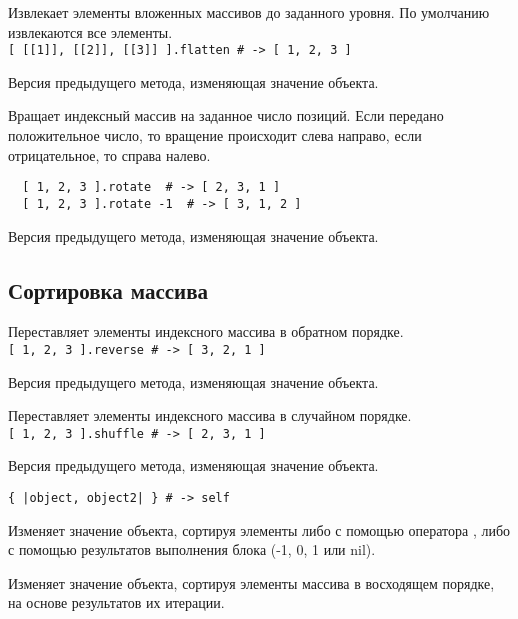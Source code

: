 \begin{methodlist}
  Извлекает элементы вложенных массивов до заданного уровня. По умолчанию извлекаются все элементы. 
  \\\verb![ [[1]], [[2]], [[3]] ].flatten # -> [ 1, 2, 3 ]!
 
  Версия предыдущего метода, изменяющая значение объекта. 

  Вращает индексный массив на заданное число позиций. Если передано положительное число, то вращение происходит слева направо, если отрицательное, то справа налево.
  \begin{verbatim}
  [ 1, 2, 3 ].rotate  # -> [ 2, 3, 1 ]
  [ 1, 2, 3 ].rotate -1  # -> [ 3, 1, 2 ]
  \end{verbatim}

  Версия предыдущего метода, изменяющая значение объекта. 
\end{methodlist}

\subsection*{Сортировка массива}

\begin{methodlist}
  Переставляет элементы индексного массива в обратном порядке. 
  \\\verb![ 1, 2, 3 ].reverse # -> [ 3, 2, 1 ]!

  Версия предыдущего метода, изменяющая значение объекта. 

  Переставляет элементы индексного массива в случайном порядке. 
  \\\verb![ 1, 2, 3 ].shuffle # -> [ 2, 3, 1 ]!

  Версия предыдущего метода, изменяющая значение объекта. 

  \verb!{ |object, object2| } # -> self!

  Изменяет значение объекта, сортируя элементы либо с помощью оператора \method{<=>}, либо с помощью результатов выполнения блока (-1, 0, 1 или nil).

  Изменяет значение объекта, сортируя элементы массива в восходящем порядке, на основе результатов их итерации. 
\end{methodlist}

